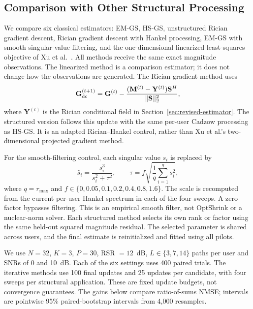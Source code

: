 \subsection{Comparison with Other Structural Processing}
\label{sec:revision-structured-comparisons}

We compare six classical estimators: EM-GS, HS-GS, unstructured Rician
gradient descent, Rician gradient descent with Hankel processing, EM-GS
with smooth singular-value filtering, and the one-dimensional linearized
least-squares objective of Xu et al.~\cite{xu2025}. All methods receive
the same exact magnitude observations. The linearized method is a
comparison estimator; it does not change how the observations are generated.
The Rician gradient method uses
\begin{equation}
\mathbf G^{(t+1)}_{\rm dc}
=\mathbf G^{(t)}-
\frac{(\mathbf M^{(t)}-\mathbf Y^{(t)})\mathbf S^H}
     {\|\mathbf S\|_2^2},
\end{equation}
where $\mathbf Y^{(t)}$ is the Rician conditional field in
Section~\ref{sec:revised-estimator}. The structured version follows this
update with the same per-user Cadzow processing as HS-GS. It is an adapted
Rician--Hankel control, rather than Xu et al.'s two-dimensional projected
gradient method.

For the smooth-filtering control, each singular value $s_i$ is replaced by
\begin{equation}
\widehat s_i=\frac{s_i^3}{s_i^2+\tau^2},
\qquad
\tau=f\sqrt{\frac{1}{q}\sum_{i=1}^{q}s_i^2},
\end{equation}
where $q=r_{\max}$ and
$f\in\{0,0.05,0.1,0.2,0.4,0.8,1.6\}$.
The scale is recomputed from the current per-user Hankel spectrum in each
of the four sweeps. A zero factor bypasses filtering. This is an empirical
smooth filter, not OptShrink or a nuclear-norm solver. Each structured
method selects its own rank or factor using the same held-out squared
magnitude residual. The selected parameter is shared across users, and
the final estimate is reinitialized and fitted using all pilots.

We use $N=32$, $K=3$, $P=30$, RSR $=12$~dB,
$L\in\{3,7,14\}$ paths per user and SNRs of 0 and 10~dB. Each of the
six settings uses 400 paired trials. The iterative methods use 100 final
updates and 25 updates per candidate, with four sweeps per structural
application. These are fixed update budgets, not convergence guarantees.
The gains below compare ratio-of-sums NMSE; intervals are pointwise 95\%
paired-bootstrap intervals from 4,000 resamples.

